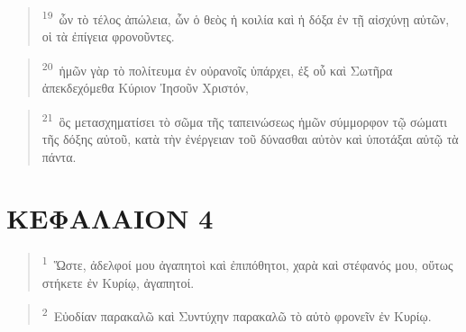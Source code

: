 \documentclass{article}
\newcommand{\currentverse}{1} %
\newcommand{\setcurrentverse}[1]{\renewcommand{\currentverse}{#1}}
\begin{document}
\begin{verse}

\setcurrentverse{19}

\setcounter{footnote}{0}

\textsuperscript{19}~ὧν τὸ τέλος ἀπώλεια, ὧν ὁ θεὸς ἡ κοιλία καὶ ἡ δόξα ἐν τῇ αἰσχύνῃ αὐτῶν, οἱ τὰ ἐπίγεια φρονοῦντες.

\end{verse}

\begin{verse}

\setcurrentverse{20}

\setcounter{footnote}{0}

\textsuperscript{20}~ἡμῶν γὰρ τὸ πολίτευμα ἐν οὐρανοῖς ὑπάρχει, ἐξ οὗ καὶ Σωτῆρα ἀπεκδεχόμεθα Κύριον Ἰησοῦν Χριστόν,

\end{verse}

\begin{verse}

\setcurrentverse{21}

\setcounter{footnote}{0}

\textsuperscript{21}~ὃς μετασχηματίσει τὸ σῶμα τῆς ταπεινώσεως ἡμῶν σύμμορφον τῷ σώματι τῆς δόξης αὐτοῦ, κατὰ τὴν ἐνέργειαν τοῦ δύνασθαι αὐτὸν καὶ ὑποτάξαι αὐτῷ τὰ πάντα.

\end{verse}

\section*{ΚΕΦΑΛΑΙΟΝ 4}

\begin{verse}

\setcurrentverse{1}

\setcounter{footnote}{0}

\textsuperscript{1}~Ὥστε, ἀδελφοί μου ἀγαπητοὶ καὶ ἐπιπόθητοι, χαρὰ καὶ στέφανός μου, οὕτως στήκετε ἐν Κυρίῳ, ἀγαπητοί.

\end{verse}

\begin{verse}

\setcurrentverse{2}

\setcounter{footnote}{0}

\textsuperscript{2}~Εὐοδίαν παρακαλῶ καὶ Συντύχην παρακαλῶ τὸ αὐτὸ φρονεῖν ἐν Κυρίῳ.

\end{verse}
\end{document}
